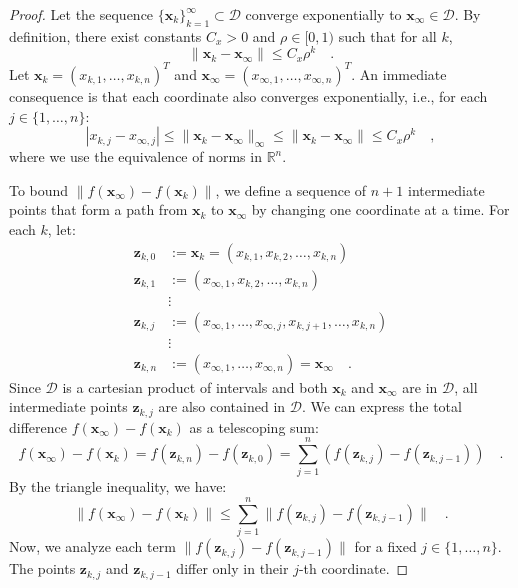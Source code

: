 \documentclass[../../main.tex]{subfiles}
\begin{document}
\begin{proof}
Let the sequence $\{\bm{x}_k\}_{k=1}^\infty \subset \mathcal{D}$ converge exponentially to $\bm{x}_\infty \in \mathcal{D}$. By definition, there exist constants $C_x > 0$ and $\rho \in [0, 1)$ such that for all $k$,
\[
    \|\bm{x}_k - \bm{x}_\infty\| \le C_x \rho^k \quad .
\]
Let $\bm{x}_k = (x_{k,1}, \dots, x_{k,n})^T$ and $\bm{x}_\infty = (x_{\infty,1}, \dots, x_{\infty,n})^T$. An immediate consequence is that each coordinate also converges exponentially, i.e., for each $j \in \{1, \dots, n\}$:
\[
    |x_{k,j} - x_{\infty,j}| \le \|\bm{x}_k - \bm{x}_\infty\|_{\infty} \le \|\bm{x}_k - \bm{x}_\infty\| \le C_x \rho^k \quad ,
\]
where we use the equivalence of norms in $\mathbb{R}^n$.

To bound $\|f(\bm{x}_\infty) - f(\bm{x}_k)\|$, we define a sequence of $n+1$ intermediate points that form a path from $\bm{x}_k$ to $\bm{x}_\infty$ by changing one coordinate at a time. For each $k$, let:
\begin{align*}
    \bm{z}_{k,0} &:= \bm{x}_k = (x_{k,1}, x_{k,2}, \dots, x_{k,n}) \\
    \bm{z}_{k,1} &:= (x_{\infty,1}, x_{k,2}, \dots, x_{k,n}) \\
    & \vdots \\
    \bm{z}_{k,j} &:= (x_{\infty,1}, \dots, x_{\infty,j}, x_{k,j+1}, \dots, x_{k,n}) \\
    & \vdots \\
    \bm{z}_{k,n} &:= (x_{\infty,1}, \dots, x_{\infty,n}) = \bm{x}_\infty \quad .
\end{align*}
Since $\mathcal{D}$ is a cartesian product of intervals and both $\bm{x}_k$ and $\bm{x}_\infty$ are in $\mathcal{D}$, all intermediate points $\bm{z}_{k,j}$ are also contained in $\mathcal{D}$. We can express the total difference $f(\bm{x}_\infty) - f(\bm{x}_k)$ as a telescoping sum:
\[
    f(\bm{x}_\infty) - f(\bm{x}_k) = f(\bm{z}_{k,n}) - f(\bm{z}_{k,0}) = \sum_{j=1}^{n} \left( f(\bm{z}_{k,j}) - f(\bm{z}_{k,j-1}) \right) \quad .
\]
By the triangle inequality, we have:
\[
    \|f(\bm{x}_\infty) - f(\bm{x}_k)\| \le \sum_{j=1}^{n} \|f(\bm{z}_{k,j}) - f(\bm{z}_{k,j-1})\| \quad .
\]
Now, we analyze each term $\|f(\bm{z}_{k,j}) - f(\bm{z}_{k,j-1})\|$ for a fixed $j \in \{1, \dots, n\}$. The points $\bm{z}_{k,j}$ and $\bm{z}_{k,j-1}$ differ only in their $j$-th coordinate.


\end{proof}
\end{document}
